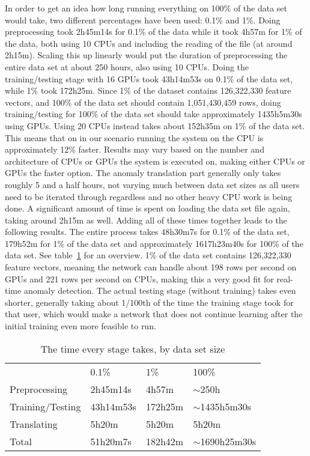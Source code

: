 In order to get an idea how long running everything on 100\% of the data set would take, two different percentages have been used: 0.1\% and 1\%. Doing preprocessing took 2h45m14s for 0.1\% of the data while it took 4h57m for 1\% of the data, both using 10 CPUs and including the reading of the file (at around 2h15m). Scaling this up linearly would put the duration of preprocessing the entire data set at about 250 hours, also using 10 CPUs. Doing the training/testing stage with 16 GPUs took 43h14m53s on 0.1\% of the data set, while 1\% took 172h25m. Since 1\% of the dataset contains 126,322,330 feature vectors, and 100\% of the data set should contain 1,051,430,459 rows, doing training/testing for 100\% of the data set should take approximately 1435h5m30s using GPUs. Using 20 CPUs instead takes about 152h35m on 1\% of the data set. This means that on in our scenario running the system on the CPU is approximately 12\% faster. Results may vary based on the number and architecture of CPUs or GPUs the system is executed on, making either CPUs or GPUs the faster option. The anomaly translation part generally only takes roughly 5 and a half hours, not varying much between data set sizes as all users need to be iterated through regardless and no other heavy CPU work is being done. A significant amount of time is spent on loading the data set file again, taking around 2h15m as well. Adding all of these times together leads to the following results. The entire process takes 48h30m7s for 0.1\% of the data set, 179h52m for 1\% of the data set and approximately 1617h23m40s for 100\% of the data set. See table~\ref{tab:times_taken} for an overview. 1\% of the data set contains 126,322,330 feature vectors, meaning the network can handle about 198 rows per second on GPUs and 221 rows per second on CPUs, making this a very good fit for real-time anomaly detection. The actual testing stage (without training) takes even shorter, generally taking about 1/100th of the time the training stage took for that user, which would make a network that does not continue learning after the initial training even more feasible to run.

\begin{table}[]
	\centering
	\caption{The time every stage takes, by data set size}
	\label{tab:times_taken}
	\begin{tabular}{llll}
										  & 0.1\%     & 1\%     & 100\%             \\ \cline{2-4} 
	\multicolumn{1}{l|}{Preprocessing}    & 2h45m14s  & 4h57m   & \(\sim\)250h        \\
	\multicolumn{1}{l|}{Training/Testing} & 43h14m53s & 172h25m & \(\sim\)1435h5m30s \\
	\multicolumn{1}{l|}{Translating}      & 5h20m     & 5h20m   & 5h20m             \\
	\multicolumn{1}{l|}{Total}            & 51h20m7s  & 182h42m & \(\sim\)1690h25m30s
	\end{tabular}
\end{table}